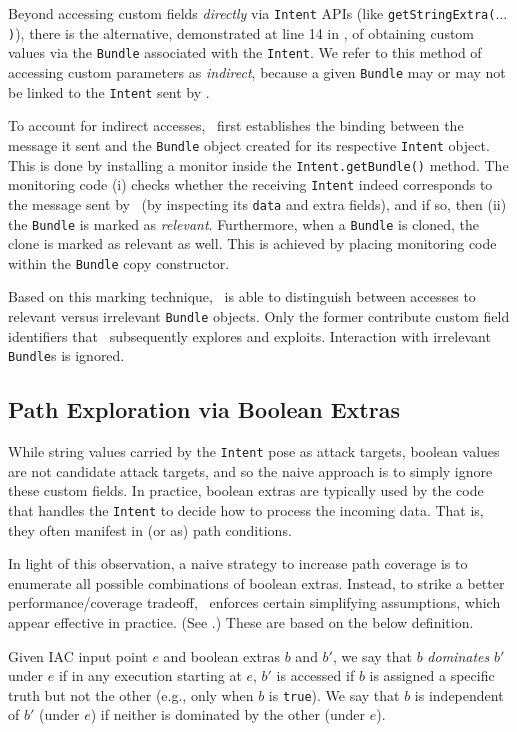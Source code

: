 Beyond accessing custom fields \emph{directly} via {\tt Intent} APIs (like {\tt getStringExtra($\ldots$)}), there is the alternative, demonstrated at line 14 in , of obtaining custom values via the {\tt Bundle} associated with the {\tt Intent}. We refer to this method of accessing custom parameters as \emph{indirect}, because a given {\tt Bundle} may or may not be linked to the {\tt Intent} sent by \Tool.

To account for indirect accesses, \Tool\ first establishes the binding between the message it sent and the {\tt Bundle} object created for its respective {\tt Intent} object. This is done by installing a monitor inside the {\tt Intent.getBundle()} method. The monitoring code (i) checks whether the receiving {\tt Intent} indeed corresponds to the message sent by \Tool\ (by inspecting its {\tt data} and extra fields), and if so, then (ii) the {\tt Bundle} is marked as \emph{relevant}. Furthermore, when a {\tt Bundle} is cloned, the clone is marked as relevant as well. This is achieved by placing monitoring code within the {\tt Bundle} copy constructor.

Based on this marking technique, \Tool\ is able to distinguish between accesses to relevant versus irrelevant {\tt Bundle} objects. Only the former contribute custom field identifiers that \Tool\ subsequently explores and exploits. Interaction with irrelevant {\tt Bundle}s is ignored.

\subsection{Path Exploration via Boolean Extras}

While string values carried by the {\tt Intent} pose as attack targets, boolean values are not candidate attack targets, and so the naive approach is to simply ignore these custom fields. In practice, boolean extras are typically used by the code that handles the {\tt Intent} to decide how to process the incoming data. That is, they often manifest in (or as) path conditions.

In light of this observation, a naive strategy to increase path coverage is to enumerate all possible combinations of boolean extras. Instead, to strike a better performance/coverage tradeoff, \Tool\ enforces certain simplifying assumptions, which appear effective in practice. (See .) These are based on the below definition.

\begin{definition} Given IAC input point $e$ and boolean extras $b$ and $b'$, we say that $b$ \emph{dominates} $b'$ under $e$ if in any execution starting at $e$, $b'$ is accessed if $b$ is assigned a specific truth but not the other (e.g., only when $b$ is {\tt true}). We say that $b$ is independent of $b'$ (under $e$) if neither is dominated by the other (under $e$).
\end{definition}

